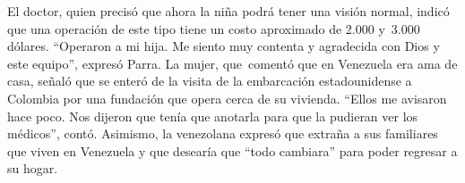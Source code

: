 \documentclass{article}%
\begin{document}
\newline%
%
El doctor, quien precisó que ahora la niña podrá tener una visión normal, indicó que una operación de este tipo tiene un costo aproximado de 2.000 y~3.000 dólares.%
\newline%
%
“Operaron a mi hija. Me siento muy contenta y agradecida con Dios y este equipo”, expresó Parra.%
\newline%
%
La mujer, que~comentó que en Venezuela era ama de casa, señaló que se enteró de la visita de la embarcación estadounidense a Colombia por una fundación que opera cerca de su vivienda.%
\newline%
%
“Ellos me avisaron hace poco. Nos dijeron que tenía que anotarla para que la pudieran ver los médicos”, contó.%
\newline%
%
Asimismo, la venezolana expresó que extraña a sus familiares que viven en Venezuela y que desearía que “todo cambiara” para poder regresar a su hogar.%
\newline%
%
\end{document}
